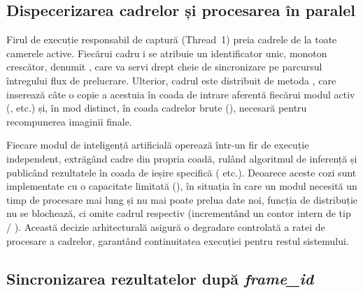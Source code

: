 \documentclass[../../main.tex]{subfiles}
\begin{document}

\subsection{Dispecerizarea cadrelor și procesarea în paralel}
\label{subsec:dispecerizare}

Firul de execuție responsabil de captură (Thread~1) preia cadrele de la toate camerele active. Fiecărui cadru i se atribuie un identificator unic, monoton crescător, denumit , care va servi drept cheie de sincronizare pe parcursul întregului flux de prelucrare. Ulterior, cadrul este distribuit de metoda , care inserează câte o copie a acestuia în coada de intrare aferentă fiecărui modul activ (,  \linebreak {} etc.) și, în mod distinct, în coada cadrelor brute (), necesară pentru recompunerea imaginii finale.

Fiecare modul de inteligență artificială operează într-un fir de execuție independent, extrăgând cadre din propria coadă, rulând algoritmul de inferență și publicând rezultatele în coada de ieșire specifică ( etc.). Deoarece aceste cozi sunt implementate cu o capacitate limitată (), în situația în care un modul necesită un timp de procesare mai lung și nu mai poate prelua date noi, funcția de distribuție nu se blochează, ci omite cadrul respectiv (incrementând un contor intern de tip  / ). Această decizie arhitecturală asigură o degradare controlată a ratei de procesare a cadrelor, garantând continuitatea execuției pentru restul sistemului.

\subsection{Sincronizarea rezultatelor după \textit{frame\_id}}
\label{subsec:sincronizare}
\end{document}
